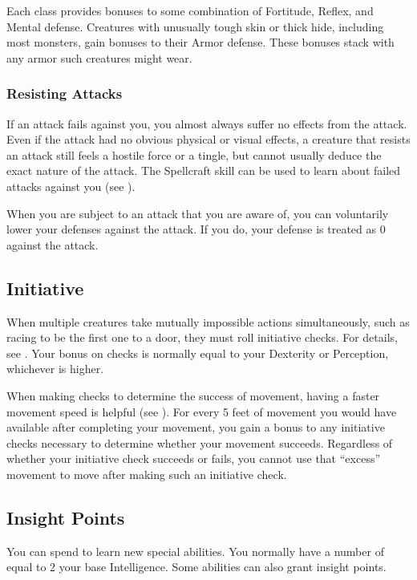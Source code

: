              Each class provides bonuses to some combination of Fortitude, Reflex, and Mental defense.
             Creatures with unusually tough skin or thick hide, including most monsters, gain bonuses to their Armor defense.
            These bonuses stack with any armor such creatures might wear.

        \subsubsection{Resisting Attacks}
            If an attack fails against you, you almost always suffer no effects from the attack.
            Even if the attack had no obvious physical or visual effects, a creature that resists an attack still feels a hostile force or a tingle, but cannot usually deduce the exact nature of the attack.
            The Spellcraft skill can be used to learn about failed  attacks against you (see ).

             When you are subject to an attack that you are aware of, you can voluntarily lower your defenses against the attack.
            If you do, your defense is treated as 0 against the attack.

    \subsection{Initiative}\label{Initiative}
        When multiple creatures take mutually impossible actions simultaneously, such as racing to be the first one to a door, they must roll initiative checks.
        For details, see .
        Your bonus on  checks is normally equal to your Dexterity or Perception, whichever is higher.

        \label{Movement-Based Initiative}
        When making  checks to determine the success of movement, having a faster movement speed is helpful (see ).
        For every 5 feet of movement you would have available after completing your movement, you gain a  bonus to any initiative checks necessary to determine whether your movement succeeds.
        Regardless of whether your initiative check succeeds or fails, you cannot use that ``excess'' movement to move after making such an initiative check.

    \subsection{Insight Points}\label{Insight Points}
        You can spend  to learn new special abilities.
        You normally have a number of  equal to 2 \add your base Intelligence.
        Some abilities can also grant insight points.

